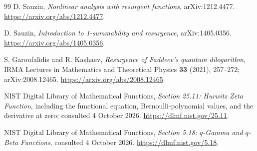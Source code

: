 \documentclass[11pt,a4paper]{article}
\numberwithin{equation}{section}
\theoremstyle{definition}
\theoremstyle{remark}
\begin{document}
\begin{thebibliography}{99}
D. Sauzin, \emph{Nonlinear analysis with resurgent functions},
arXiv:1212.4477.\newline
\url{https://arxiv.org/abs/1212.4477}.

D. Sauzin, \emph{Introduction to 1-summability and resurgence},
arXiv:1405.0356.\newline
\url{https://arxiv.org/abs/1405.0356}.

S. Garoufalidis and R. Kashaev,
\emph{Resurgence of Faddeev's quantum dilogarithm},
IRMA Lectures in Mathematics and Theoretical Physics \textbf{33}
(2021), 257--272; arXiv:2008.12465.\newline
\url{https://arxiv.org/abs/2008.12465}.

NIST Digital Library of Mathematical Functions,
\emph{Section 25.11: Hurwitz Zeta Function}, including the functional
equation, Bernoulli-polynomial values, and the derivative at zero;
consulted 4 October 2026.\newline
\url{https://dlmf.nist.gov/25.11}.

NIST Digital Library of Mathematical Functions,
\emph{Section 5.18: $q$-Gamma and $q$-Beta Functions},
consulted 4 October 2026.\newline
\url{https://dlmf.nist.gov/5.18}.

\end{thebibliography}
\end{document}
